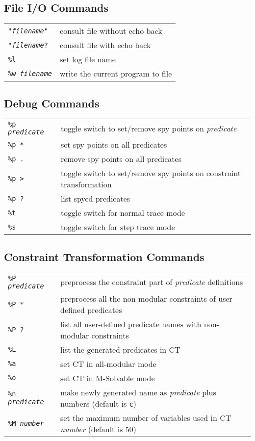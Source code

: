 \subsection{File I/O Commands}
\begin{tabular}{ll}
{\tt "{\em filename}"} & consult file without echo back\\
{\tt "{\em filename}?}& consult file with echo back	\\
{\tt \%l}	& set log file name	\\
{\tt \%w {\em filename}}	& write the current program to file\\
\end{tabular}

\subsection{Debug Commands}
\begin{tabular}{ll}
{\tt \%p {\em predicate}} & toggle switch to
         set/remove spy points on {\em predicate}\\
{\tt \%p *} 	& set spy points on all predicates	\\
{\tt \%p .}	& remove spy points on all predicates\\
{\tt \%p >}	& toggle switch to set/remove spy points on constraint
transformation\\
{\tt \%p ?}	& list spyed predicates\\
{\tt \%t}	& toggle switch for normal trace mode\\
{\tt \%s}	& toggle switch for step trace mode\\
\end{tabular}

\subsection{Constraint Transformation Commands}
\begin{tabular}{ll}
{\tt \%P {\em predicate}} & preprocess the constraint part of {\em
predicate} definitions\\
{\tt \%P *}	& preprocess all the non-modular constraints of user-defined
predicates\\
{\tt \%P ?}     & list all user-defined predicate names with non-modular
constraints\\
{\tt \%L}	& list the generated predicates in CT\\
{\tt \%a}	& set CT in all-modular mode\\
{\tt \%o}	& set CT in M-Solvable mode\\
{\tt \%n {\em predicate}} & 
	make newly generated name as {\em predicate} plus numbers
(default is {\tt c})\\
{\tt \%M {\em number}} & set the maximum number of variables used in CT
{\em number} (default is 50)\\
\end{tabular}

